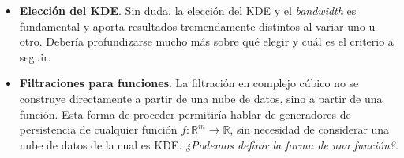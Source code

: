 \documentclass[12pt,a4paper,twoside]{article} %
\theoremstyle{plain}
\theoremstyle{definition}
\newcommand{\R}{\mathbb{R}}
\newcommand{\map}[3]{#1 \colon #2 \to #3}
\begin{document}
\begin{itemize}
\item \textbf{Elección del KDE}. Sin duda, la elección del KDE y el \emph{bandwidth} es fundamental y aporta resultados tremendamente distintos al variar uno u otro. Debería profundizarse mucho más sobre qué elegir y cuál es el criterio a seguir.

\item \textbf{Filtraciones para funciones}. La filtración en complejo cúbico no se construye directamente a partir de una nube de datos, sino a partir de una función. Esta forma de proceder permitiría hablar de generadores de persistencia de cualquier función $\map{f}{\R^m}{\R}$, sin necesidad de considerar una nube de datos de la cual es KDE. \emph{¿Podemos definir la forma de una función?}.

\end{itemize}
\end{document}
